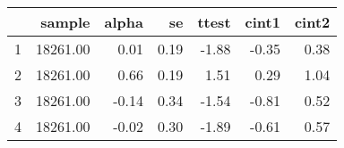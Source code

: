\begin{table}[ht]
\centering
\begin{tabular}{rrrrrrr}
  \hline
 & sample & alpha & se & ttest & cint1 & cint2 \\ 
  \hline
1 & 18261.00 & 0.01 & 0.19 & -1.88 & -0.35 & 0.38 \\ 
  2 & 18261.00 & 0.66 & 0.19 & 1.51 & 0.29 & 1.04 \\ 
  3 & 18261.00 & -0.14 & 0.34 & -1.54 & -0.81 & 0.52 \\ 
  4 & 18261.00 & -0.02 & 0.30 & -1.89 & -0.61 & 0.57 \\ 
   \hline
\end{tabular}
\end{table}
